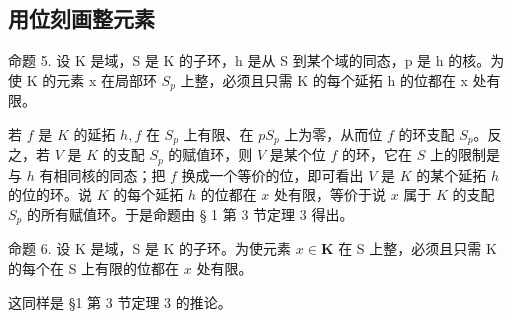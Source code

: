 \subsection{用位刻画整元素}

命题 5. 设 K 是域，S 是 K 的子环，h 是从 S 到某个域的同态，p 是 h 的核。为使 K 的元素 x 在局部环 \(S_{p}\) 上整，必须且只需 K 的每个延拓 h 的位都在 x 处有限。

若 \(f\) 是 \(K\) 的延拓 \(h, f\) 在 \(S_p\) 上有限、在 \(pS_p\) 上为零，从而位 \(f\) 的环支配 \(S_p\)。反之，若 \(V\) 是 \(K\) 的支配 \(S_p\) 的赋值环，则 \(V\) 是某个位 \(f\) 的环，它在 \(S\) 上的限制是与 \(h\) 有相同核的同态；把 \(f\) 换成一个等价的位，即可看出 \(V\) 是 \(K\) 的某个延拓 \(h\) 的位的环。说 \(K\) 的每个延拓 \(h\) 的位都在 \(x\) 处有限，等价于说 \(x\) 属于 \(K\) 的支配 \(S_p\) 的所有赋值环。于是命题由 § 1 第 3 节定理 3 得出。

命题 6. 设 K 是域，S 是 K 的子环。为使元素 \(x \in \mathbf{K}\) 在 S 上整，必须且只需 K 的每个在 S 上有限的位都在 \(x\) 处有限。

这同样是 §1 第 3 节定理 3 的推论。

